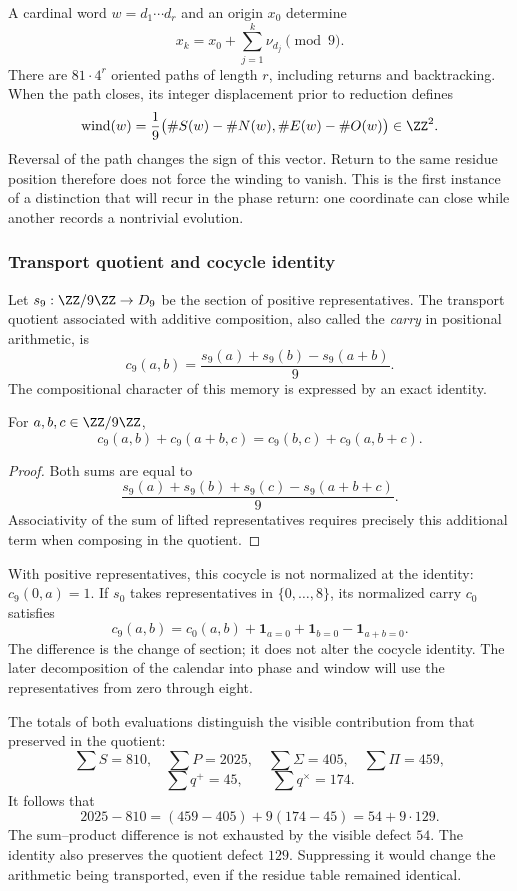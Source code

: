 A cardinal word \(w=d_1\cdots d_r\) and an origin \(x_0\) determine
\[
 x_k=x_0+\sum_{j=1}^k\nu_{d_j}\pmod9.
\]
There are \(81\cdot4^r\) oriented paths of length \(r\), including returns and backtracking. When the path closes, its integer displacement prior to reduction defines
\begin{equation}
 \operatorname{wind}(w)=\frac19
 \bigl(\#S(w)-\#N(w),\#E(w)-\#O(w)\bigr)\in\ZZ^2.
\end{equation}
Reversal of the path changes the sign of this vector. Return to the same residue position therefore does not force the winding to vanish. This is the first instance of a distinction that will recur in the phase return: one coordinate can close while another records a nontrivial evolution.

\subsubsection{Transport quotient and cocycle identity}

Let \(s_9:\ZZ/9\ZZ\to D_9\) be the section of positive representatives. The transport quotient associated with additive composition, also called the \emph{carry} in positional arithmetic, is
\[
 c_9(a,b)=\frac{s_9(a)+s_9(b)-s_9(a+b)}9.
\]
The compositional character of this memory is expressed by an exact identity.

\begin{lemma}
For \(a,b,c\in\ZZ/9\ZZ\),
\[
 c_9(a,b)+c_9(a+b,c)=c_9(b,c)+c_9(a,b+c).
\]
\end{lemma}
\begin{proof}
Both sums are equal to
\[
 \frac{s_9(a)+s_9(b)+s_9(c)-s_9(a+b+c)}9.
\]
Associativity of the sum of lifted representatives requires precisely this additional term when composing in the quotient.
\end{proof}

With positive representatives, this cocycle is not normalized at the identity: \(c_9(0,a)=1\). If \(s_0\) takes representatives in \(\{0,\ldots,8\}\), its normalized carry \(c_0\) satisfies
\[
 c_9(a,b)=c_0(a,b)+\mathbf1_{a=0}+\mathbf1_{b=0}-\mathbf1_{a+b=0}.
\]
The difference is the change of section; it does not alter the cocycle identity. The later decomposition of the calendar into phase and window will use the representatives from zero through eight.

The totals of both evaluations distinguish the visible contribution from that preserved in the quotient:
\[
 \sum S=810,\quad\sum P=2025,\quad
 \sum\Sigma=405,\quad\sum\Pi=459,
\]
\[
 \sum q^+=45,\qquad\sum q^\times=174.
\]
It follows that
\begin{equation}
 2025-810=(459-405)+9(174-45)=54+9\cdot129.
 \label{eq:defecto-integrado}
\end{equation}
The sum--product difference is not exhausted by the visible defect \(54\). The identity also preserves the quotient defect \(129\). Suppressing it would change the arithmetic being transported, even if the residue table remained identical.

